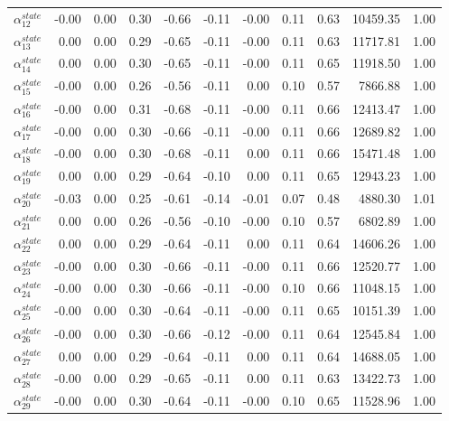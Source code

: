 \documentclass[12pt,english,a4paper]{article}
\begin{document}
\begin{table}[ht]
\begin{tabular}{rrrrrrrrrrr}
  $\alpha_{12}^{state}$ & -0.00 & 0.00 & 0.30 & -0.66 & -0.11 & -0.00 & 0.11 & 0.63 & 10459.35 & 1.00 \\ 
  $\alpha_{13}^{state}$ & 0.00 & 0.00 & 0.29 & -0.65 & -0.11 & -0.00 & 0.11 & 0.63 & 11717.81 & 1.00 \\
  $\alpha_{14}^{state}$ & 0.00 & 0.00 & 0.30 & -0.65 & -0.11 & -0.00 & 0.11 & 0.65 & 11918.50 & 1.00 \\
  $\alpha_{15}^{state}$ & -0.00 & 0.00 & 0.26 & -0.56 & -0.11 & 0.00 & 0.10 & 0.57 & 7866.88 & 1.00 \\ 
  $\alpha_{16}^{state}$ & -0.00 & 0.00 & 0.31 & -0.68 & -0.11 & -0.00 & 0.11 & 0.66 & 12413.47 & 1.00 \\ 
  $\alpha_{17}^{state}$ & -0.00 & 0.00 & 0.30 & -0.66 & -0.11 & -0.00 & 0.11 & 0.66 & 12689.82 & 1.00 \\ 
  $\alpha_{18}^{state}$ & -0.00 & 0.00 & 0.30 & -0.68 & -0.11 & 0.00 & 0.11 & 0.66 & 15471.48 & 1.00 \\
  $\alpha_{19}^{state}$ & 0.00 & 0.00 & 0.29 & -0.64 & -0.10 & 0.00 & 0.11 & 0.65 & 12943.23 & 1.00 \\ 
  $\alpha_{20}^{state}$ & -0.03 & 0.00 & 0.25 & -0.61 & -0.14 & -0.01 & 0.07 & 0.48 & 4880.30 & 1.01 \\
  $\alpha_{21}^{state}$ & 0.00 & 0.00 & 0.26 & -0.56 & -0.10 & -0.00 & 0.10 & 0.57 & 6802.89 & 1.00 \\ 
  $\alpha_{22}^{state}$ & 0.00 & 0.00 & 0.29 & -0.64 & -0.11 & 0.00 & 0.11 & 0.64 & 14606.26 & 1.00 \\ 
  $\alpha_{23}^{state}$ & -0.00 & 0.00 & 0.30 & -0.66 & -0.11 & -0.00 & 0.11 & 0.66 & 12520.77 & 1.00 \\ 
  $\alpha_{24}^{state}$ & -0.00 & 0.00 & 0.30 & -0.66 & -0.11 & -0.00 & 0.10 & 0.66 & 11048.15 & 1.00 \\ 
  $\alpha_{25}^{state}$ & -0.00 & 0.00 & 0.30 & -0.64 & -0.11 & -0.00 & 0.11 & 0.65 & 10151.39 & 1.00 \\ 
  $\alpha_{26}^{state}$ & -0.00 & 0.00 & 0.30 & -0.66 & -0.12 & -0.00 & 0.11 & 0.64 & 12545.84 & 1.00 \\ 
  $\alpha_{27}^{state}$ & 0.00 & 0.00 & 0.29 & -0.64 & -0.11 & 0.00 & 0.11 & 0.64 & 14688.05 & 1.00 \\ 
  $\alpha_{28}^{state}$ & -0.00 & 0.00 & 0.29 & -0.65 & -0.11 & 0.00 & 0.11 & 0.63 & 13422.73 & 1.00 \\
  $\alpha_{29}^{state}$ & -0.00 & 0.00 & 0.30 & -0.64 & -0.11 & -0.00 & 0.10 & 0.65 & 11528.96 & 1.00 \\ 

\end{tabular}
\end{table}
\end{document}
